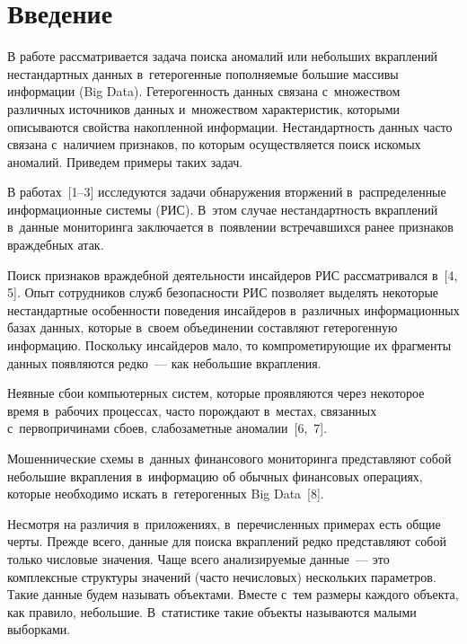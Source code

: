 \begin{multicols}{2}

\label{st\stat}
   
  \section{Введение}
  
  \vspace*{-4pt}
  
  В работе рассматривается задача поиска аномалий или небольших вкраплений 
нестандартных данных в~гетерогенные пополняемые большие массивы 
информации (Big Data). Гетерогенность данных связана с~множеством различных 
источников данных и~множеством характеристик, которыми описываются 
свойства накопленной информации. Нестандартность данных часто связана 
с~наличием признаков, по которым осуществляется поиск искомых аномалий. 
Приведем примеры таких задач.
{

}
  
  В работах~[1--3] исследуются задачи обнаружения вторжений 
в~распределенные информационные системы (РИС). В~этом случае 
нестандартность вкрап\-ле\-ний в~данные мониторинга \mbox{заключается} в~появлении 
встречавшихся ранее признаков враждебных атак.
  
  Поиск признаков враждебной деятельности инсайдеров РИС рассматривался 
в~[4, 5]. Опыт сотрудников служб безопасности РИС позволяет выделять 
некоторые нестандартные особенности поведения инсайдеров в~различных 
информационных базах данных, которые в~своем объединении составляют 
гетерогенную информацию. Поскольку инсайдеров мало, то компрометирующие 
их фрагменты данных появляются редко~--- как небольшие вкрап\-ле\-ния.
  
  Неявные сбои компьютерных систем, которые проявляются через некоторое 
время в~рабочих процессах, часто порождают в~местах, связанных 
с~первопричинами сбоев, слабозаметные аномалии~[6,~7].
  
  Мошеннические схемы в~данных финансового мониторинга представляют 
собой небольшие вкрап\-ле\-ния в~информацию об обычных финансовых операциях, 
которые необходимо искать в~гетерогенных Big Data~[8].
  
  Несмотря на различия в~приложениях, в~перечисленных примерах есть общие 
черты. Прежде всего, данные для поиска вкраплений редко представляют собой 
только числовые значения. Чаще всего анализируемые данные~--- это 
комплексные структуры значений (часто нечисловых) нескольких параметров. 
Такие данные будем называть объектами. Вместе с~тем размеры каждого объекта, 
как правило, небольшие. В~статистике такие объекты называются малыми 
выборками. 
  

\end{multicols}
